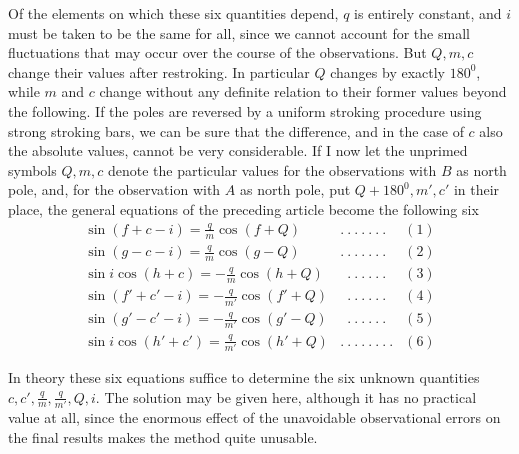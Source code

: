Of the elements on which these six quantities depend, $q$ is entirely constant, and $i$ must be taken to be the same for all, since we cannot account for the small fluctuations that may occur over the course of the observations. But $Q,m,c$ change their values after restroking. In particular $Q$ changes by exactly $180^0$, while $m$ and $c$ change without any definite relation to their former values beyond the following. If the poles are reversed by a uniform stroking procedure using strong stroking bars, we can be sure that the difference, and in the case of $c$ also the absolute values, cannot be very considerable. If I now let the unprimed symbols $Q,m,c$ denote the particular values for the observations with $B$ as north pole, and, for the observation with $A$ as north pole, put $Q+180^0,m',c'$ in their place, the general equations of the preceding article become the following six
\[
\begin{array}{lll}
\sin(f+c-i)=\frac{q}{m}\cos(f+Q)&.\ .\ .\ .\ .\ .\ .&(1)\\[4pt]
\sin(g-c-i)=\frac{q}{m}\cos(g-Q)&.\ .\ .\ .\ .\ .\ .&(2)\\[4pt]
\sin i\cos(h+c)=-\frac{q}{m}\cos(h+Q)&\phantom{.}\ .\ .\ .\ .\ .\ .&(3)\\[4pt]
\sin(f'+c'-i)=-\frac{q}{m'}\cos(f'+Q)&\phantom{.}\ .\ .\ .\ .\ .\ .&(4)\\[4pt]
\sin(g'-c'-i)=-\frac{q}{m'}\cos(g'-Q)&\phantom{.}\ .\ .\ .\ .\ .\ .&(5)\\[4pt]
\sin i\cos(h'+c')=\frac{q}{m'}\cos(h'+Q)&.\ .\ .\ .\ .\ .\ .\ .&(6)
\end{array}
\]

In theory these six equations suffice to determine the six unknown quantities $c,c',\frac{q}{m},\frac{q}{m'},Q,i$. The solution may be given here, although it has no practical value at all, since the enormous effect of the unavoidable observational errors on the final results makes the method quite unusable.

